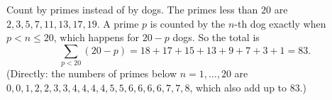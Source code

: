 Count by primes instead of by dogs. The primes less than $20$ are $2,3,5,7,11,13,17,19$. A prime $p$ is counted by the $n$-th dog exactly when $p<n\le20$, which happens for $20-p$ dogs. So the total is
\[\sum_{p<20}(20-p)=18+17+15+13+9+7+3+1=\boxed{83}.\]
(Directly: the numbers of primes below $n=1,\dots,20$ are $0,0,1,2,2,3,3,4,4,4,4,5,5,6,6,6,6,7,7,8$, which also add up to $83$.)
